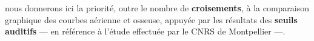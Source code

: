 nous
donnerons ici la priorité, outre le nombre de \textbf{croisements}, à la comparaison graphique
des courbes aérienne et osseuse, appuyée  par les résultats
des \textbf{seuils auditifs} --- en référence à
  l'étude effectuée par le CNRS de Montpellier\autocite{affectiveDisorders} ---.


